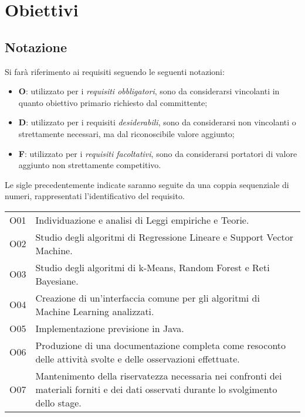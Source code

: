 \section{Obiettivi}
\subsection{Notazione}
Si farà riferimento ai requisiti seguendo le seguenti notazioni:
\begin{itemize}
\item \textbf{O}: utilizzato per i \textit{requisiti obbligatori}, sono da considerarsi vincolanti in quanto obiettivo primario richiesto dal committente;
\item \textbf{D}: utilizzato per i requisiti \textit{desiderabili}, sono da considerarsi non vincolanti o strettamente necessari, ma dal riconoscibile valore
aggiunto;
\item \textbf{F}: utilizzato per i \textit{requisiti facoltativi}, sono da considerarsi portatori di valore aggiunto non strettamente competitivo.
\end{itemize}
Le sigle precedentemente indicate saranno seguite da una coppia sequenziale di numeri, rappresentati l'identificativo del requisito.

{\renewcommand{\arraystretch}{2}
\begin{longtable}{|p{1cm}| p{12.25cm} |}
	\hline
	\rowcolor{blue} \multicolumn{2}{|c|}{
	\textbf{Requisiti Obbligatori}
	} \\
		\endhead
		\hline \rowcolor{lightbrown}
		O01 & 
		Individuazione e analisi di Leggi empiriche  e Teorie. \\	
		\hline \rowcolor{lighterbrown}
		O02 & 
		Studio degli algoritmi di Regressione Lineare e Support Vector Machine. \\	
		\hline \rowcolor{lightbrown}
		O03 & 
		Studio degli algoritmi di k-Means, Random Forest e Reti Bayesiane.\\	
	\hline \rowcolor{lighterbrown}
		O04 & 
		Creazione di un'interfaccia comune per gli algoritmi di Machine Learning analizzati.\\	
	\hline \rowcolor{lightbrown}
		O05 & 
		Implementazione previsione in Java.\\	
	\hline \rowcolor{lighterbrown}
		O06 & 
		Produzione di una documentazione completa come resoconto delle attività svolte e delle
osservazioni effettuate.\\	
	\hline \rowcolor{lighterbrown}
		O07 & 
		Mantenimento della riservatezza necessaria nei confronti dei materiali forniti e dei dati osservati durante lo svolgimento dello stage.\\	
	\hline
\end{longtable}}

